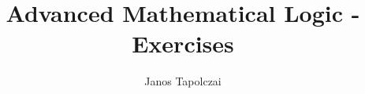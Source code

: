\documentclass[]{scrartcl}
\title{Advanced Mathematical Logic - Exercises}
\author{Janos Tapolczai}
\begin{document}
\maketitle

\begin{abstract}

\end{abstract}






















\end{document}

